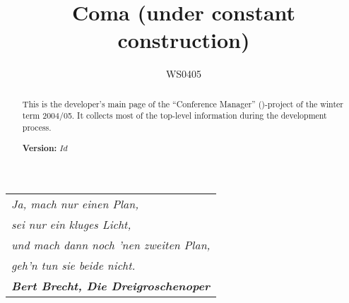 \documentclass[11pt]{article}
\title{{\huge\bf Coma} (under constant construction)}
\author{WS0405}
\date{}
\begin{document}
\vspace{-2cm}





\maketitle{}



\begin{abstract}
  This is the developer's main page of the ``Conference Manager''
  (\Coma)-project of the winter term 2004/05. It collects most of the
  top-level information during the development process.

  \begin{center}
    \textbf{Version:} \texttt{$Id$}
  \end{center}
\end{abstract}




%



%



{\centering
  \begin{minipage}{10cm}
    \begin{tabular}[t]{l}
    \em
    Ja, mach nur einen Plan, 
    \\
    \emph{sei nur ein kluges Licht, }
    \\ 
    \emph{und mach dann noch 'nen zweiten Plan, }
    \\
    \emph{geh'n tun sie beide nicht.}
    \\
    \textbf{\em Bert Brecht, Die Dreigroschenoper}
\end{tabular}
  \end{minipage}}





%

%












\end{document}
